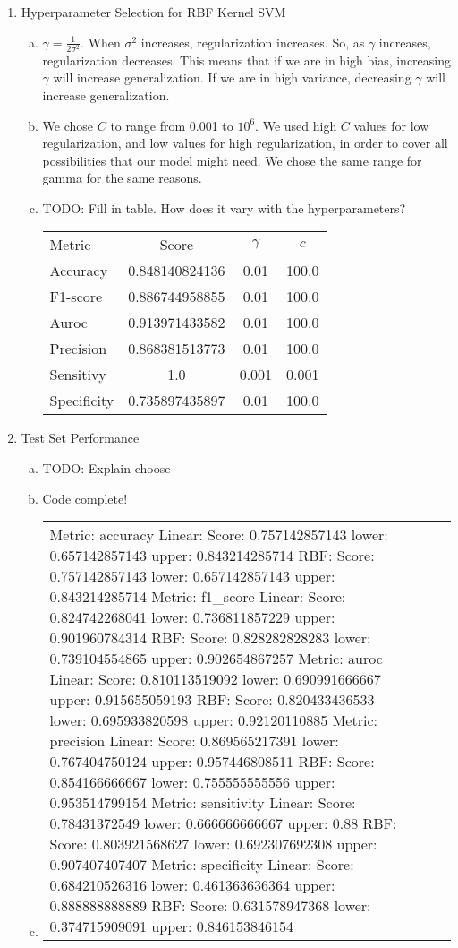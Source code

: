 \documentclass[11pt]{article}
\begin{document}
\begin{enumerate}[(2)]
\begin{enumerate}[(b)]
\end{enumerate}
\item Hyperparameter Selection for RBF Kernel SVM
\begin{enumerate}[(a)]
\item $\gamma = \frac{1}{2\sigma^2}$. When $\sigma^2$ increases, regularization increases. So, as $\gamma$
increases, regularization decreases. This means that if we are in high bias, increasing $\gamma$ will 
increase generalization. If we are in high variance, decreasing $\gamma$ will increase generalization. 
\item We chose $C$ to range from 0.001 to $10^6$. We used high $C$ values for low regularization, and 
low values for high regularization, in order to cover all possibilities that our model might need. We chose
the same range for gamma for the same reasons. 
\item TODO: Fill in table. How does it vary with the hyperparameters?

\begin{tabular}{| l | c | c | c |}
\hline
Metric & Score & $\gamma$ & $c$ \\
Accuracy & 0.848140824136 & 0.01 & 100.0 \\
F1-score & 0.886744958855 & 0.01 & 100.0 \\
Auroc & 0.913971433582 & 0.01 & 100.0 \\
Precision & 0.868381513773 & 0.01 & 100.0 \\
Sensitivy & 1.0 & 0.001 & 0.001 \\
Specificity & 0.735897435897 & 0.01 & 100.0 \\
\hline
\end{tabular}
\end{enumerate}
\item Test Set Performance
\begin{enumerate}[(a)]
\item TODO: Explain choose
\item Code complete!
\item 
\begin{tabular}{| l | c | c | c |}
\hline
Metric: accuracy
Linear: Score: 0.757142857143 lower: 0.657142857143 upper: 0.843214285714
RBF: Score: 0.757142857143 lower: 0.657142857143 upper: 0.843214285714
Metric: f1\_score
Linear: Score: 0.824742268041 lower: 0.736811857229 upper: 0.901960784314
RBF: Score: 0.828282828283 lower: 0.739104554865 upper: 0.902654867257
Metric: auroc
Linear: Score: 0.810113519092 lower: 0.690991666667 upper: 0.915655059193
RBF: Score: 0.820433436533 lower: 0.695933820598 upper: 0.92120110885
Metric: precision
Linear: Score: 0.869565217391 lower: 0.767404750124 upper: 0.957446808511
RBF: Score: 0.854166666667 lower: 0.755555555556 upper: 0.953514799154
Metric: sensitivity
Linear: Score: 0.78431372549 lower: 0.666666666667 upper: 0.88
RBF: Score: 0.803921568627 lower: 0.692307692308 upper: 0.907407407407
Metric: specificity
Linear: Score: 0.684210526316 lower: 0.461363636364 upper: 0.888888888889
RBF: Score: 0.631578947368 lower: 0.374715909091 upper: 0.846153846154
\hline
\end{tabular}
\end{enumerate}
\end{enumerate}
\end{document}
